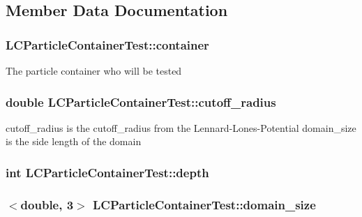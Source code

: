 \subsection{Member Data Documentation}
\hypertarget{classLCParticleContainerTest_aedb4bb8eb12e6079e1509ac1563c4022}{
\subsubsection[{container}]{ L\-C\-Particle\-Container\-Test\-::container\hspace{0.3cm}{\ttfamily [private]}}}\label{classLCParticleContainerTest_aedb4bb8eb12e6079e1509ac1563c4022}
The particle container who will be tested \hypertarget{classLCParticleContainerTest_a8489fd1951bb0c38acb2debd9cc5d447}{
\subsubsection[{cutoff\-\_\-radius}]{\setlength{\rightskip}{0pt plus 5cm}double L\-C\-Particle\-Container\-Test\-::cutoff\-\_\-radius\hspace{0.3cm}{\ttfamily [private]}}}\label{classLCParticleContainerTest_a8489fd1951bb0c38acb2debd9cc5d447}
cutoff\-\_\-radius is the cutoff\-\_\-radius from the Lennard-\/\-Lones-\/\-Potential domain\-\_\-size is the side length of the domain \hypertarget{classLCParticleContainerTest_ab58d0d6496deca62a6452851aed96ef5}{
\subsubsection[{depth}]{\setlength{\rightskip}{0pt plus 5cm}int L\-C\-Particle\-Container\-Test\-::depth\hspace{0.3cm}{\ttfamily [private]}}}\label{classLCParticleContainerTest_ab58d0d6496deca62a6452851aed96ef5}
\hypertarget{classLCParticleContainerTest_ab6450ef8318882ca6931be58e6ce58aa}{
\subsubsection[{domain\-\_\-size}]{$<$double, 3$>$ L\-C\-Particle\-Container\-Test\-::domain\-\_\-size\hspace{0.3cm}{\ttfamily [private]}}}\label{classLCParticleContainerTest_ab6450ef8318882ca6931be58e6ce58aa}

